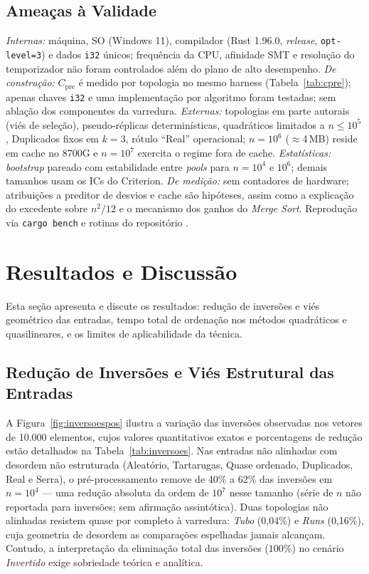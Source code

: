 \documentclass[portuguese]{sbc2025}%
\begin{document}
\subsection{Ameaças à Validade}

\emph{Internas:} máquina, SO (Windows 11), compilador (Rust 1.96.0, \emph{release}, \texttt{opt-level=3}) e dados \texttt{i32} únicos; frequência da CPU, afinidade SMT e resolução do temporizador não foram controlados além do plano de alto desempenho. \emph{De construção:} $C_{\text{pre}}$ é medido por topologia no mesmo harness (Tabela~\ref{tab:cpre}); apenas chaves \texttt{i32} e uma implementação por algoritmo foram testadas; sem ablação dos componentes da varredura. \emph{Externas:} topologias em parte autorais (viés de seleção), pseudo-réplicas determinísticas, quadráticos limitados a $n{\le}10^5$, Duplicados fixos em $k{=}3$, rótulo ``Real'' operacional; $n{=}10^6$ ($\approx$4\,MB) reside em cache no 8700G e $n{=}10^7$ exercita o regime fora de cache. \emph{Estatísticas:} \emph{bootstrap} pareado com estabilidade entre \emph{pools} para $n{=}10^4$ e $10^6$; demais tamanhos usam os ICs do Criterion. \emph{De medição:} sem contadores de hardware; atribuições a preditor de desvios e cache são hipóteses, assim como a explicação do excedente sobre $n^2/12$ e o mecanismo dos ganhos do \emph{Merge Sort}. Reprodução via \texttt{cargo bench} e rotinas do repositório \citep{nascimento_repositorio_2026}.

\section{Resultados e Discussão}\label{sec:res}

Esta seção apresenta e discute os resultados: redução de inversões e viés geométrico das entradas, tempo total de ordenação nos métodos quadráticos e quasilineares, e os limites de aplicabilidade da técnica.

\subsection{Redução de Inversões e Viés Estrutural das Entradas}

A Figura~\ref{fig:inversoespos} ilustra a variação das inversões observadas nos vetores de 10.000 elementos, cujos valores quantitativos exatos e porcentagens de redução estão detalhados na Tabela~\ref{tab:inversoes}. Nas entradas não alinhadas com desordem não estruturada (Aleatório, Tartarugas, Quase ordenado, Duplicados, Real e Serra), o pré-processamento remove de 40\% a 62\% das inversões em $n{=}10^4$ --- uma redução absoluta da ordem de $10^7$ nesse tamanho (série de $n$ não reportada para inversões; sem afirmação assintótica). Duas topologias não alinhadas resistem quase por completo à varredura: \emph{Tubo} (0{,}04\%) e \emph{Runs} (0{,}16\%), cuja geometria de desordem as comparações espelhadas jamais alcançam. Contudo, a interpretação da eliminação total das inversões ($100\%$) no cenário \emph{Invertido} exige sobriedade teórica e analítica.
\end{document}
